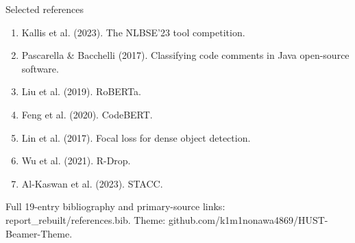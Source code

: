 \documentclass[aspectratio=169,10pt]{beamer}
\newcommand{\src}[1]{\vfill{\tiny\color{gray}#1\par}}
\begin{document}
\begin{frame}{Selected references}
\small
\begin{enumerate}\item Kallis et al. (2023). The NLBSE'23 tool competition.\medskip
\item Pascarella \& Bacchelli (2017). Classifying code comments in Java open-source software.\medskip
\item Liu et al. (2019). RoBERTa.\medskip
\item Feng et al. (2020). CodeBERT.\medskip
\item Lin et al. (2017). Focal loss for dense object detection.\medskip
\item Wu et al. (2021). R-Drop.\medskip
\item Al-Kaswan et al. (2023). STACC.\end{enumerate}
\src{Full 19-entry bibliography and primary-source links: report\_rebuilt/references.bib. Theme: github.com/k1m1nonawa4869/HUST-Beamer-Theme.}
\end{frame}
\end{document}

